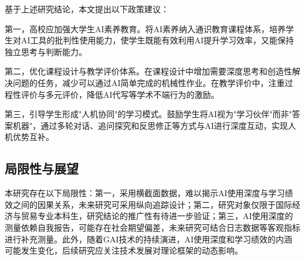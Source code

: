 \documentclass{njtech-thesis}
\begin{document}
基于上述研究结论，本文提出以下政策建议：

第一，高校应加强大学生AI素养教育。将AI素养纳入通识教育课程体系，培养学生对AI工具的批判性使用能力，使学生既能有效利用AI提升学习效率，又能保持独立思考与判断能力。

第二，优化课程设计与教学评价体系。在课程设计中增加需要深度思考和创造性解决问题的任务，减少可以通过AI简单完成的机械性作业。在教学评价中，注重过程性评价与多元评价，降低AI代写等学术不端行为的激励。

第三，引导学生形成"人机协同"的学习模式。鼓励学生将AI视为"学习伙伴"而非"答案机器"，通过多轮对话、追问探究和反思修正等方式与AI进行深度互动，实现人机优势互补。

\subsection{局限性与展望}

本研究存在以下局限性：第一，采用横截面数据，难以揭示AI使用深度与学习绩效之间的因果关系，未来研究可采用纵向追踪设计；第二，研究对象仅限于国际经济与贸易专业本科生，研究结论的推广性有待进一步验证；第三，AI使用深度的测量依赖自我报告，可能存在社会期望偏差，未来研究可结合日志数据等客观指标进行补充测量。此外，随着GAI技术的持续演进，AI使用深度和学习绩效的内涵可能发生变化，后续研究应关注技术发展对理论框架的动态影响。

\makereference
\end{document}
